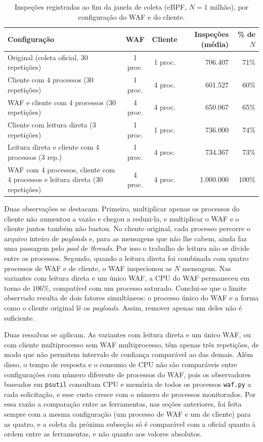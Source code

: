 \begin{table}[htbp]
\centering
\caption{Inspeções registradas ao fim da janela de coleta (eBPF, $N = 1$ milhão), por configuração do WAF e do cliente.}
\label{tab:sensibilidade}
\begin{tabularx}{\textwidth}{>{\raggedright\arraybackslash}X c c r r}
\hline
\textbf{Configuração} & \textbf{WAF} & \textbf{Cliente} & \textbf{Inspeções (média)} & \textbf{\% de $N$} \\
\hline
Original (coleta oficial, 30 repetições)           & 1 proc. & 1 proc. & 706.407   & 71\% \\
Cliente com 4 processos (30 repetições)            & 1 proc. & 4 proc. & 601.527   & 60\% \\
WAF e cliente com 4 processos (30 repetições)      & 4 proc. & 4 proc. & 650.067   & 65\% \\
Cliente com leitura direta (3 repetições)          & 1 proc. & 1 proc. & 736.000   & 74\% \\
Leitura direta e cliente com 4 processos (3 rep.)  & 1 proc. & 4 proc. & 734.367   & 73\% \\
WAF com 4 processos, cliente com 4 processos e leitura direta (30 repetições) & 4 proc. & 4 proc. & 1.000.000 & 100\% \\
\hline
\end{tabularx}
\end{table}

Duas observações se destacam. Primeiro, multiplicar apenas os processos do cliente não aumentou a vazão e chegou a reduzi-la, e multiplicar o WAF e o cliente juntos também não bastou. No cliente original, cada processo percorre o arquivo inteiro de \textit{payloads} e, para as mensagens que não lhe cabem, ainda faz uma passagem pelo \textit{pool} de \textit{threads}. Por isso o trabalho de leitura não se divide entre os processos. Segundo, quando a leitura direta foi combinada com quatro processos de WAF e de cliente, o WAF inspecionou as $N$ mensagens. Nas variantes com leitura direta e um único WAF, a CPU do WAF permaneceu em torno de $106\%$, compatível com um processo saturado. Conclui-se que o limite observado resulta de dois fatores simultâneos: o processo único do WAF e a forma como o cliente original lê os \textit{payloads}. Assim, remover apenas um deles não é suficiente.

Duas ressalvas se aplicam. As variantes com leitura direta e um único WAF, ou com cliente multiprocesso sem WAF multiprocesso, têm apenas três repetições, de modo que não permitem intervalo de confiança comparável ao das demais. Além disso, o tempo de resposta e o consumo de CPU não são comparáveis entre configurações com número diferente de processos do WAF, pois os observadores baseados em \texttt{psutil} consultam CPU e memória de todos os processos \texttt{waf.py} a cada solicitação, e esse custo cresce com o número de processos monitorados. Por essa razão a comparação entre as ferramentas, nas seções anteriores, foi feita sempre com a mesma configuração (um processo de WAF e um de cliente) para as quatro, e a coleta da próxima subseção só é comparável com a oficial quanto à ordem entre as ferramentas, e não quanto aos valores absolutos.

